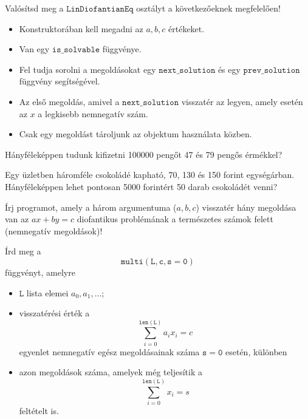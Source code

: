 \begin{exercise} Valósítsd meg a $\mathtt{LinDiofantianEq}$ osztályt a
  következőeknek megfelelően!
  \begin{itemize}
    \item Konstruktorában kell megadni az $a,b,c$ értékeket.
    \item Van egy $\mathtt{is\_solvable}$ függvénye.
    \item Fel tudja sorolni a megoldásokat egy $\mathtt{next\_solution}$ és
      egy $\mathtt{prev\_solution}$ függvény segítségével.
    \item Az első megoldás, amivel a $\mathtt{next\_solution}$ visszatér az
      legyen, amely esetén az $x$ a legkisebb nemnegatív szám.
    \item Csak egy megoldást tároljunk az objektum használata közben.
  \end{itemize}
\end{exercise}

\begin{exercise}
  Hányféleképpen tudunk kifizetni 100000 peng\H ot 47 és 79 peng\H os
  érmékkel?
\end{exercise}


\begin{exercise}
  Egy üzletben háromféle csokoládé kapható, 70, 130 és 150 forint
  egységárban. Hányféleképpen lehet pontosan 5000 forintért 50
  darab csokoládét venni?
\end{exercise}

\begin{exercise}
  Írj programot, amely a három argumentuma ($a,b,c$) visszatér hány
  megoldása van az $ax+by=c$ diofantikus problémának a természetes
  számok felett (nemnegatív megoldások)!
\end{exercise}

\begin{exercise}
  Írd meg a \[ \mathtt{multi(L, c, s=0)} \]
  függvényt, amelyre
  \begin{itemize}
    \item $\mathtt{L}$ lista elemei $a_0,a_1,\dots$;
    \item visszatérési érték a \[ \sum_{i=0}^{\mathtt{len(L)}} a_ix_i = c \]
      egyenlet nemnegatív egész megoldásainak száma $\mathtt{s=0}$ esetén,
      különben
    \item azon megoldások száma, amelyek még teljesítik a
      \[ \sum_{i=0}^{\mathtt{len(L)}} x_i = s \]
      feltételt is.
  \end{itemize}
\end{exercise}
